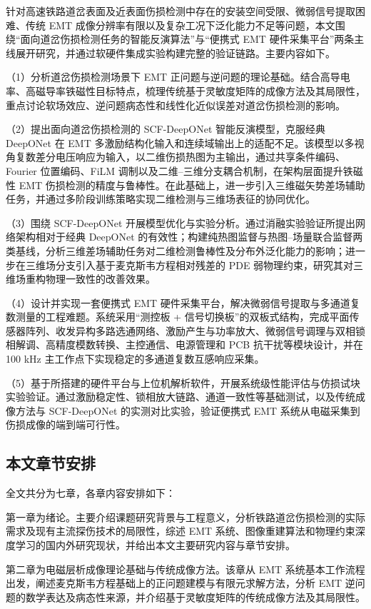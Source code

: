 针对高速铁路道岔表面及近表面伤损检测中存在的安装空间受限、微弱信号提取困难、传统 EMT 成像分辨率有限以及复杂工况下泛化能力不足等问题，本文围绕“面向道岔伤损检测任务的智能反演算法”与“便携式 EMT 硬件采集平台”两条主线展开研究，并通过软硬件集成实验构建完整的验证链路。主要内容如下。

（1）分析道岔伤损检测场景下 EMT 正问题与逆问题的理论基础。结合高导电率、高磁导率铁磁性目标特点，梳理传统基于灵敏度矩阵的成像方法及其局限性，重点讨论软场效应、逆问题病态性和线性化近似误差对道岔伤损检测的影响。

（2）提出面向道岔伤损检测的 SCF-DeepONet 智能反演模型，克服经典 DeepONet 在 EMT 多激励结构化输入和连续域输出上的适配不足。该模型以多视角复数差分电压响应为输入，以二维伤损热图为主输出，通过共享条件编码、Fourier 位置编码\citep{keylist}、FiLM 调制以及二维--三维分支耦合机制，在架构层面提升铁磁性 EMT 伤损检测的精度与鲁棒性。在此基础上，进一步引入三维磁矢势差场辅助任务，并通过多阶段训练策略实现二维检测与三维场表征的协同优化。

（3）围绕 SCF-DeepONet 开展模型优化与实验分析。通过消融实验验证所提出网络架构相对于经典 DeepONet 的有效性；构建纯热图监督与热图--场量联合监督两类基线，分析三维差场辅助任务对二维检测鲁棒性及分布外泛化能力的影响；进一步在三维场分支引入基于麦克斯韦方程相对残差的 PDE 弱物理约束，研究其对三维场重构物理一致性的改善效果。

（4）设计并实现一套便携式 EMT 硬件采集平台，解决微弱信号提取与多通道复数测量的工程难题。系统采用“测控板 + 信号切换板”的双板式结构，完成平面传感器阵列、收发异构多路选通网络、激励产生与功率放大、微弱信号调理与双相锁相解调、高精度模数转换、主控通信、电源管理和 PCB 抗干扰等模块设计，并在 100 kHz 主工作点下实现稳定的多通道复数互感响应采集。

（5）基于所搭建的硬件平台与上位机解析软件，开展系统级性能评估与仿损试块实验验证。通过激励稳定性、锁相放大链路、通道一致性等基础测试，以及传统成像方法与 SCF-DeepONet 的实测对比实验，验证便携式 EMT 系统从电磁采集到伤损成像的端到端可行性。
 
\subsection{本文章节安排}

全文共分为七章，各章内容安排如下：

第一章为绪论。主要介绍课题研究背景与工程意义，分析铁路道岔伤损检测的实际需求及现有主流探伤技术的局限性，综述 EMT 系统、图像重建算法和物理约束深度学习的国内外研究现状，并给出本文主要研究内容与章节安排。

第二章为电磁层析成像理论基础与传统成像方法。该章从 EMT 系统基本工作流程出发，阐述麦克斯韦方程基础上的正问题建模与有限元求解方法，分析 EMT 逆问题的数学表达及病态性来源，并介绍基于灵敏度矩阵的传统成像方法及其局限性。


